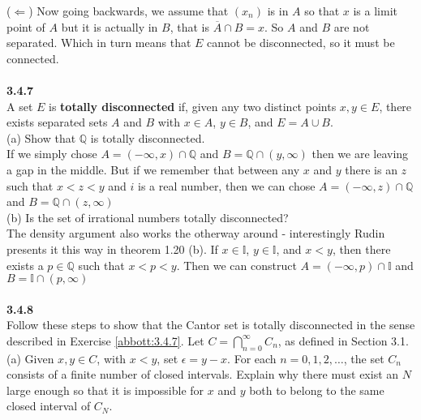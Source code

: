 ($\Leftarrow$) Now going backwards, we assume that $(x_n)$ is in $A$ so that $x$ is a limit point of $A$
but it is actually in $B$, that is $\overline{A} \cap B = x$.
So $A$ and $B$ are not separated.
Which in turn means that $E$ cannot be disconnected, so it must be connected.
\\~\\




\label{abbott:3.4.7}
\textbf{3.4.7}
\\

A set $E$ is \textbf{totally disconnected} if,
given any two distinct points $x,y \in E$,
there exists separated sets $A$ and $B$
with $x\in A$, $y \in B$, and $E = A \cup B$.
\\

(a) Show that $\mathbb{Q}$ is totally disconnected.
\\

If we simply chose $A = (-\infty, x) \cap \mathbb{Q}$ and $B = \mathbb{Q} \cap (y, \infty)$
then we are leaving a gap in the middle.
But if we remember that between any $x$ and $y$ there is an $z$ such that $x < z < y$
and $i$ is a real number, then we can chose
$A = (-\infty, z) \cap \mathbb{Q}$ and $B = \mathbb{Q} \cap (z, \infty)$
\\

(b) Is the set of irrational numbers totally disconnected?
\\

The density argument also works the otherway around - interestingly Rudin presents it this way
in theorem 1.20 (b).
If $x \in \mathbb{I}$, $y \in \mathbb{I}$, and $x < y$, then there exists a $p \in \mathbb{Q}$
such that $x < p < y$.
Then we can construct
$A = (-\infty, p) \cap \mathbb{I}$ and $B = \mathbb{I} \cap (p, \infty)$
\\~\\




\label{abbott:3.4.8}
\textbf{3.4.8}
\\

Follow these steps to show that the Cantor set is totally disconnected in the sense described in
Exercise \ref{abbott:3.4.7}.
Let $C = \bigcap_{n=0}^{\infty} C_n$, as defined in Section 3.1.
\\

(a) Given $x,y \in C$, with $x < y$, set $\epsilon = y - x$.
For each $n = 0, 1, 2, \ldots$, the set $C_n$ consists of a finite number of closed intervals.
Explain why there must exist an $N$ large enough so that it is impossible for $x$ and $y$ both to
belong to the same closed interval of $C_N$.
\\

